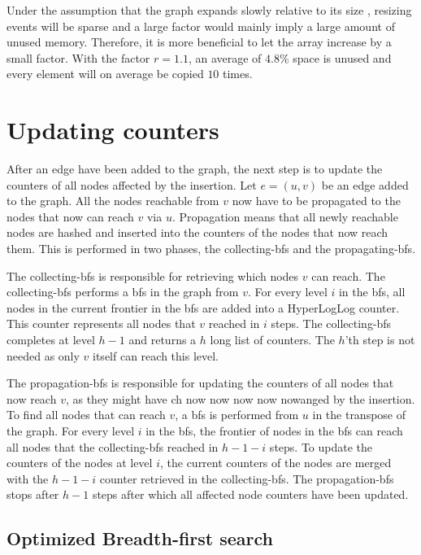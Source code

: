 Under the assumption that the graph expands slowly relative to its size , resizing events will be sparse and a large factor would mainly imply a large amount of unused memory. Therefore, it is more beneficial to let the array increase by a small factor. With the factor $r = 1.1$, an average of $4.8$\% space is unused and every element will on average be copied $10$ times.

\section{Updating counters}

After an edge have been added to the graph, the next step is to update the counters of all nodes affected by the insertion. Let $e = (u,v)$ be an edge added to the graph. All the nodes reachable from $v$ now have to be propagated to the nodes that now can reach $v$ via $u$. Propagation means that all newly reachable nodes are hashed and inserted into the counters of the nodes that now reach them. This is performed in two phases, the collecting-bfs and the propagating-bfs. 

The collecting-bfs is responsible for retrieving which nodes $v$ can reach. The collecting-bfs performs a bfs in the graph from $v$. For every level $i$ in the bfs, all nodes in the current frontier in the bfs are added into a HyperLogLog counter. This counter represents all nodes that $v$ reached in $i$ steps. The collecting-bfs completes at level $h-1$ and returns a $h$ long list of counters. The $h$'th step is not needed as only $v$ itself can reach this level. 

The propagation-bfs is responsible for updating the counters of all nodes that now reach $v$, as they might have ch now now now now nowanged by the insertion. To find all nodes that can reach $v$, a bfs is performed from $u$ in the transpose of the graph. For every level $i$ in the bfs, the frontier of nodes in the bfs can reach all nodes that the collecting-bfs reached in $h-1-i$ steps. To update the counters of the nodes at level $i$, the current counters of the nodes are merged with the $h-1-i$ counter retrieved in the collecting-bfs. The propagation-bfs stops after $h-1$ steps after which all affected node counters have been updated.  


\subsection{Optimized Breadth-first search}

